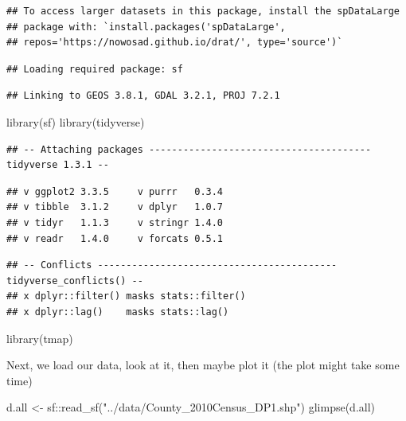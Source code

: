 \documentclass[]{article}
\newenvironment{Shaded}{\begin{snugshade}}{\end{snugshade}}
\newcommand{\FunctionTok}[1]{\textcolor[rgb]{0.00,0.00,0.00}{#1}}
\newcommand{\NormalTok}[1]{#1}
\newcommand{\OtherTok}[1]{\textcolor[rgb]{0.56,0.35,0.01}{#1}}
\newcommand{\SpecialCharTok}[1]{\textcolor[rgb]{0.00,0.00,0.00}{#1}}
\newcommand{\StringTok}[1]{\textcolor[rgb]{0.31,0.60,0.02}{#1}}
\begin{document}
\begin{verbatim}
## To access larger datasets in this package, install the spDataLarge
## package with: `install.packages('spDataLarge',
## repos='https://nowosad.github.io/drat/', type='source')`
\end{verbatim}

\begin{verbatim}
## Loading required package: sf
\end{verbatim}

\begin{verbatim}
## Linking to GEOS 3.8.1, GDAL 3.2.1, PROJ 7.2.1
\end{verbatim}

\begin{Shaded}
\begin{Highlighting}[]
\FunctionTok{library}\NormalTok{(sf)}
\FunctionTok{library}\NormalTok{(tidyverse)}
\end{Highlighting}
\end{Shaded}

\begin{verbatim}
## -- Attaching packages --------------------------------------- tidyverse 1.3.1 --
\end{verbatim}

\begin{verbatim}
## v ggplot2 3.3.5     v purrr   0.3.4
## v tibble  3.1.2     v dplyr   1.0.7
## v tidyr   1.1.3     v stringr 1.4.0
## v readr   1.4.0     v forcats 0.5.1
\end{verbatim}

\begin{verbatim}
## -- Conflicts ------------------------------------------ tidyverse_conflicts() --
## x dplyr::filter() masks stats::filter()
## x dplyr::lag()    masks stats::lag()
\end{verbatim}

\begin{Shaded}
\begin{Highlighting}[]
\FunctionTok{library}\NormalTok{(tmap)}
\end{Highlighting}
\end{Shaded}

Next, we load our data, look at it, then maybe plot it (the plot might
take some time)

\begin{Shaded}
\begin{Highlighting}[]
\NormalTok{d.all }\OtherTok{\textless{}{-}}\NormalTok{ sf}\SpecialCharTok{::}\FunctionTok{read\_sf}\NormalTok{(}\StringTok{"../data/County\_2010Census\_DP1.shp"}\NormalTok{)}
\FunctionTok{glimpse}\NormalTok{(d.all)}
\end{Highlighting}
\end{Shaded}
\end{document}

